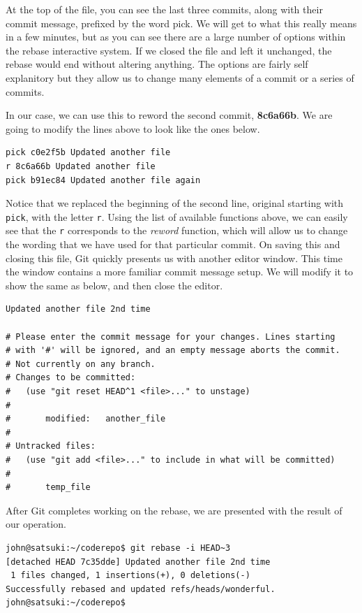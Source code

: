 At the top of the file, you can see the last three commits, along with their commit message, prefixed by the word pick.  We will get to what this really means in a few minutes, but as you can see there are a large number of options within the rebase interactive system.  If we closed the file and left it unchanged, the rebase would end without altering anything.  The options are fairly self explanitory but they allow us to change many elements of a commit or a series of commits.  

In our case, we can use this to reword the second commit, \textbf{8c6a66b}.  We are going to modify the lines above to look like the ones below.

\begin{Verbatim}
pick c0e2f5b Updated another file
r 8c6a66b Updated another file
pick b91ec84 Updated another file again
\end{Verbatim}

Notice that we replaced the beginning of the second line, original starting with \texttt{pick}, with the letter \texttt{r}.  Using the list of available functions above, we can easily see that the \texttt{r} corresponds to the \emph{reword} function, which will allow us to change the wording that we have used for that particular commit.  On saving this and closing this file, Git quickly presents us with another editor window.  This time the window contains a more familiar commit message setup.  We will modify it to show the same as below, and then close the editor.

\begin{Verbatim}
Updated another file 2nd time

# Please enter the commit message for your changes. Lines starting
# with '#' will be ignored, and an empty message aborts the commit.
# Not currently on any branch.
# Changes to be committed:
#   (use "git reset HEAD^1 <file>..." to unstage)
#
#       modified:   another_file
#
# Untracked files:
#   (use "git add <file>..." to include in what will be committed)
#
#       temp_file
\end{Verbatim}

After Git completes working on the rebase, we are presented with the result of our operation.

\begin{Verbatim}
john@satsuki:~/coderepo$ git rebase -i HEAD~3
[detached HEAD 7c35dde] Updated another file 2nd time
 1 files changed, 1 insertions(+), 0 deletions(-)
Successfully rebased and updated refs/heads/wonderful.
john@satsuki:~/coderepo$ 
\end{Verbatim}

